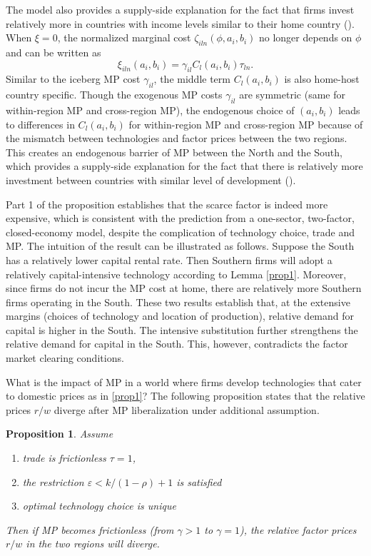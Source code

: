 \documentclass[notitlepage,11pt]{article}%
\newtheorem{proposition}{Proposition}
\begin{document}
The model also provides a supply-side explanation for the fact that firms
invest relatively more in countries with income levels similar to their home
country (\cite{fajgelbaum_linder_2014}). When $\xi=0$, the normalized marginal
cost $\zeta_{iln}\left(  \phi,a_{i},b_{i}\right)  $ no longer depends on
$\phi$ and can be written as%
\[
\xi_{iln}\left(  a_{i},b_{i}\right)  =\gamma_{il}C_{l}\left(  a_{i}%
,b_{i}\right)  \tau_{ln}\text{.}%
\]
Similar to the iceberg MP cost $\gamma_{il}$, the middle term $C_{l}\left(
a_{i},b_{i}\right)  $ is also home-host country specific. Though the exogenous
MP costs $\gamma_{il}$ are symmetric (same for within-region MP and
cross-region MP), the endogenous choice of $\left(  a_{i},b_{i}\right)  $
leads to differences in $C_{l}\left(  a_{i},b_{i}\right)  $ for within-region
MP and cross-region MP because of the mismatch between technologies and factor
prices between the two regions. This creates an endogenous barrier of MP
between the North and the South, which provides a supply-side explanation for
the fact that there is relatively more investment between countries with
similar level of development (\cite{fajgelbaum_linder_2014}).

Part 1 of the proposition establishes that the scarce factor is indeed more
expensive, which is consistent with the prediction from a one-sector,
two-factor, closed-economy model, despite the complication of technology
choice, trade and MP. The intuition of the result can be illustrated as
follows. Suppose the South has a relatively lower capital rental rate. Then
Southern firms will adopt a relatively capital-intensive technology according
to Lemma \ref{prop1}. Moreover, since firms do not incur the MP cost at home,
there are relatively more Southern firms operating in the South. These two
results establish that, at the extensive margins (choices of technology and
location of production), relative demand for capital is higher in the South.
The intensive substitution further strengthens the relative demand for capital
in the South. This, however, contradicts the factor market clearing conditions.

What is the impact of MP in a world where firms develop technologies that
cater to domestic prices as in \ref{prop1}? The following proposition states
that the relative prices $r/w$ diverge after MP liberalization under
additional assumption.

\begin{proposition}
\label{prop3}Assume

\begin{enumerate}
\item trade is frictionless $\tau=1$,

\item the restriction $\varepsilon<k/\left(  1-\rho\right)  +1$ is satisfied

\item optimal technology choice is unique
\end{enumerate}

Then if MP becomes frictionless (from $\gamma>1$ to $\gamma=1$), the relative
factor prices $r/w$ in the two regions will diverge.
\end{proposition}
\end{document}

